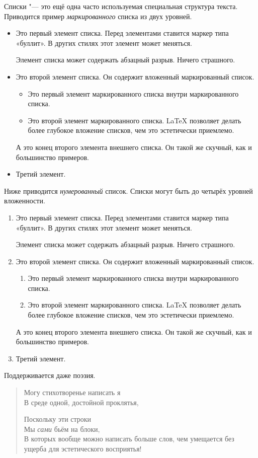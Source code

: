 \documentclass[final,pdftex]{epsilonj}
\numberwithin{equation}{section}
\begin{document}
Списки "--- это ещё одна часто используемая специальная структура текста.
Приводится пример \emph{маркированного} списка из двух уровней.
\begin{itemize}
\item Это первый элемент списка. Перед элементами ставится маркер типа «буллит». В других стилях этот элемент может меняться.

Элемент списка может содержать абзацный разрыв. Ничего страшного.
\item  Это второй элемент списка. Он содержит вложенный маркированный список. 
    \begin{itemize}
       \item Это первый элемент маркированного списка внутри маркированного списка. 
          \item Это второй элемент маркированного списка.  \LaTeX{} позволяет делать более глубокое вложение списков, чем это эстетически приемлемо.
      \end{itemize}
      А это конец второго элемента внешнего списка. Он такой же скучный, как и большинство примеров. 
   \item  Третий элемент.
\end{itemize}


Ниже приводится \emph{нумерованный} список. Списки могут быть до четырёх уровней вложенности.
\begin{enumerate}
	\item Это первый элемент списка. Перед элементами ставится маркер типа «буллит». В других стилях этот элемент может меняться.
	
	Элемент списка может содержать абзацный разрыв. Ничего страшного.
	\item  Это второй элемент списка. Он содержит вложенный маркированный список. 
	\begin{enumerate}
		\item Это первый элемент маркированного списка внутри маркированного списка. 
		\item Это второй элемент маркированного списка.  \LaTeX{} позволяет делать более глубокое вложение списков, чем это эстетически приемлемо.
	\end{enumerate}
	А это конец второго элемента внешнего списка. Он такой же скучный, как и большинство примеров. 
	\item  Третий элемент.
\end{enumerate}


Поддерживается даже поэзия.
\begin{verse}
   Могу стихотворенье написать я \\         %
   В среде одной, достойной проклятья,   %


   Поскольку эти строки \\
   Мы \emph{сами} бьём на блоки, \\
   В которых вообще можно написать больше слов, чем умещается без ущерба для эстетического восприятья!
\end{verse}
\end{document}
